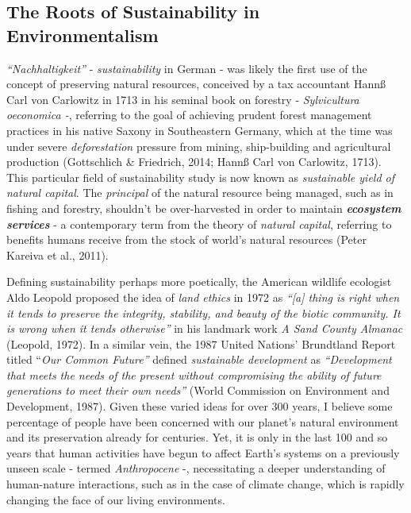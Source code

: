 \documentclass[
  12pt,
  letterpaper,
  DIV=11,
  numbers=noendperiod]{scrartcl}
\begin{document}
\subsection{The Roots of Sustainability in
Environmentalism}\label{the-roots-of-sustainability-in-environmentalism}

\emph{``Nachhaltigkeit''} - \emph{sustainability} in German - was likely
the first use of the concept of preserving natural resources, conceived
by a tax accountant Hannß Carl von Carlowitz in 1713 in his seminal book
on forestry - \emph{Sylvicultura oeconomica -}, referring to the goal of
achieving prudent forest management practices in his native Saxony in
Southeastern Germany, which at the time was under severe
\emph{deforestation} pressure from mining, ship-building and
agricultural production (Gottschlich \& Friedrich, 2014; Hannß Carl von
Carlowitz, 1713). This particular field of sustainability study is now
known as \emph{sustainable yield of natural capital}. The
\emph{principal} of the natural resource being managed, such as in
fishing and forestry, shouldn't be over-harvested in order to maintain
\textbf{\emph{ecosystem services}} - a contemporary term from the theory
of \emph{natural capital}, referring to benefits humans receive from the
stock of world's natural resources (Peter Kareiva et al., 2011).

Defining sustainability perhaps more poetically, the American wildlife
ecologist Aldo Leopold proposed the idea of \emph{land ethics} in 1972
as \emph{``{[}a{]} thing is right when it tends to preserve the
integrity, stability, and beauty of the biotic community. It is wrong
when it tends otherwise''} in his landmark work \emph{A Sand County
Almanac} (Leopold, 1972). In a similar vein, the 1987 United Nations'
Brundtland Report titled ``\emph{Our Common Future''} defined
\emph{sustainable development} as \emph{``Development that meets the
needs of the present without compromising the ability of future
generations to meet their own needs''} (World Commission on Environment
and Development, 1987). Given these varied ideas for over 300 years, I
believe some percentage of people have been concerned with our planet's
natural environment and its preservation already for centuries. Yet, it
is only in the last 100 and so years that human activities have begun to
affect Earth's systems on a previously unseen scale - termed
\emph{Anthropocene} -, necessitating a deeper understanding of
human-nature interactions, such as in the case of climate change, which
is rapidly changing the face of our living environments.
\end{document}
